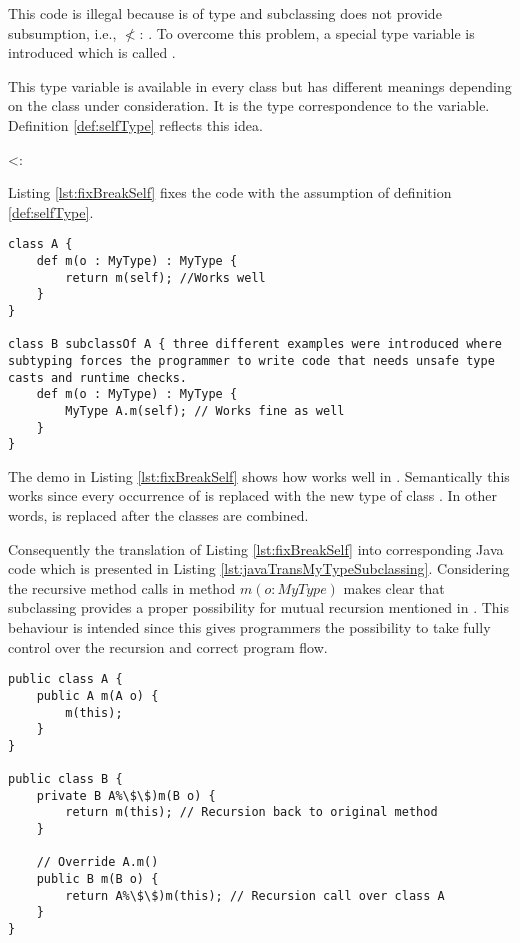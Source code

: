 This code is illegal because \self is of type \B and subclassing does
not provide subsumption, i.e., \B $\nless$: \A. To overcome this problem,
a special type variable is introduced which is called \mytype.

This type variable is available in every class but has different meanings
depending on the class under consideration. It is the type correspondence
to the \self variable. Definition \ref{def:selfType} reflects this idea.

\begin{defn}
	\label{def:selfType}
	\self <: \mytype
\end{defn}

Listing \ref{lst:fixBreakSelf} fixes the code with the assumption of
definition \ref{def:selfType}.

\begin{lstlisting}[float,language=ooplss,caption=Type safe code with \mytype,label=lst:fixBreakSelf]
class A {
	def m(o : MyType) : MyType {
		return m(self); //Works well
	}
}

class B subclassOf A { three different examples were introduced where subtyping forces the programmer to write code that needs unsafe type casts and runtime checks.
	def m(o : MyType) : MyType {
		MyType A.m(self); // Works fine as well
	}
}
\end{lstlisting}

The demo in Listing \ref{lst:fixBreakSelf} shows how \mytype works well
in \ooplss.  Semantically this works since every occurrence of \mytype
is replaced with the new type of class \B. In other words, \mytype is
replaced after the classes are combined.

Consequently the translation of Listing \ref{lst:fixBreakSelf}
into corresponding Java code which is presented in Listing
\ref{lst:javaTransMyTypeSubclassing}. Considering the recursive
method calls in method $m(o : MyType)$ makes clear that subclassing
provides a proper possibility for mutual recursion mentioned in
. This behaviour is intended since this gives
programmers the possibility to take fully control over the recursion
and correct program flow.

\begin{lstlisting}[float,caption=Subclassing with \mytype translated in Java,label=lst:javaTransMyTypeSubclassing]
public class A {
	public A m(A o) {
		m(this);
	}
}

public class B {
	private B A%\$\$)m(B o) {
		return m(this); // Recursion back to original method
	}

	// Override A.m()
	public B m(B o) {
		return A%\$\$)m(this); // Recursion call over class A
	}
}
\end{lstlisting}

